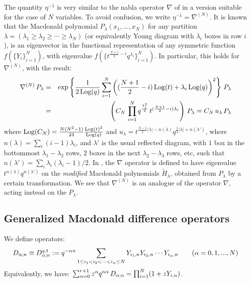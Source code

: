 \begin{remark}\label{nablarem}
The quantity $\eta^{-1}$ is very similar to the nabla operator $\nabla$ 
of \cite{BG} in a version suitable for the case of $N$ variables. To avoid confusion, we write $\eta^{-1}=\nabla^{(N)}$.
It is known \cite{Cheredbook} that the Macdonald polynomial $P_\lambda(x_1,...,x_N)$ for any 
partition $\lambda=(\lambda_1\geq \lambda_2 \geq \cdots \geq \lambda_N)$ (or equivalently Young diagram
with $\lambda_i$ boxes in row $i$), is an eigenvector
in the functional representation of any symmetric function $f(\{Y_i\}_{i=1}^N)$, with
eigenvalue $f(\{t^{\frac{N+1}{2}-i} q^{\lambda_i}\}_{i=1}^N)$. In particular, this holds for $\nabla^{(N)}$,
with the result:
\begin{eqnarray*}
{\nabla^{(N)}}\, P_\lambda&=& \exp\left\{ \frac{1}{2\,{\rm Log}(q)}\sum_{i=1}^{N} \left( (\frac{N+1}{2}-i)\,{\rm Log}(t)+\lambda_i\, {\rm Log}(q)\right)^2\right\}\, P_\lambda\\
&=&\left(C_N\, \prod_{i=1}^{N} q^{\frac{\lambda_i^2}{2}}\, t^{(\frac{N+1}{2}-i)\lambda_i}\right)\, P_\lambda
=C_N\, u_\lambda\, P_\lambda
\end{eqnarray*}
where ${\rm Log}(C_N)=\frac{N(N^2-1)}{24} \frac{{\rm Log}(t)^2}{{\rm Log}(q)}$ and
$u_\lambda=t^{\frac{N-1}{2}|\lambda|-n(\lambda)}q^{\frac{1}{2}|\lambda|+n(\lambda')} $, where
$n(\lambda)=\sum_i (i-1)\lambda_i$, and $\lambda'$ is the usual reflected diagram, with  $1$ box in the bottommost
$\lambda_1-\lambda_2$ rows, $2$ boxes in the next $\lambda_2-\lambda_3$ rows, etc, such that 
$n(\lambda')=\sum_i \lambda_i(\lambda_i-1)/2$.
In \cite{BG}, the $\nabla$ operator is defined to have eigenvalue $t^{n(\lambda)}q^{n(\lambda')}$ on the {\em modified}
Macdonald polynomials ${\widetilde H}_\lambda$, obtained from $P_\lambda$ by a certain transformation. 
We see that $\nabla^{(N)}$ is an analogue of the operator $\nabla$, acting instead on the $P_\lambda$.
\end{remark}


\subsection{Generalized Macdonald difference operators}

\begin{defn}
We define operators:
\begin{equation}\label{defnewmac} 
{D}_{{\alpha};n}\equiv {D}_{{\alpha};n}^{q,t} := q^{-{\alpha} n}\sum_{1\leq i_1<i_2<\cdots <i_{\alpha} \leq N}  
{Y}_{i_1,n}{Y}_{i_2,n} \cdots {Y}_{i_{\alpha},n} \qquad ({\alpha}=0,1,...,N)
\end{equation}
Equivalently, we have:
$\sum_{{\alpha}=0}^{r+1}z^{\alpha} q^{n{\alpha}}\,{D}_{{\alpha};n}=\prod_{i=1}^{N}(1+z Y_{i,n})$.
\end{defn}

